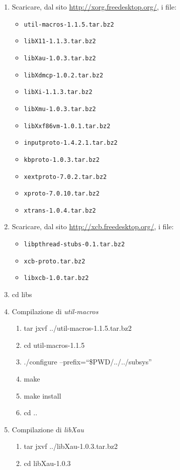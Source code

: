 \begin{enumerate}
\item Scaricare, dal sito \href{http://xorg.freedesktop.org/}{http://xorg.freedesktop.org/}, i file:
\begin{itemize}
\item \texttt{util-macros-1.1.5.tar.bz2}
\item \texttt{libX11-1.1.3.tar.bz2}
\item \texttt{libXau-1.0.3.tar.bz2}
\item \texttt{libXdmcp-1.0.2.tar.bz2}
\item \texttt{libXi-1.1.3.tar.bz2}
\item \texttt{libXmu-1.0.3.tar.bz2}
\item \texttt{libXxf86vm-1.0.1.tar.bz2}
\item \texttt{inputproto-1.4.2.1.tar.bz2}
\item \texttt{kbproto-1.0.3.tar.bz2}
\item \texttt{xextproto-7.0.2.tar.bz2}
\item \texttt{xproto-7.0.10.tar.bz2}
\item \texttt{xtrans-1.0.4.tar.bz2}
\end{itemize}
\item Scaricare, dal sito \href{http://xcb.freedesktop.org/}{http://xcb.freedesktop.org/}, i file:
\begin{itemize}
\item \texttt{libpthread-stubs-0.1.tar.bz2}
\item \texttt{xcb-proto.tar.bz2}
\item \texttt{libxcb-1.0.tar.bz2}
\end{itemize}
\item cd libs
\item Compilazione di \emph{util-macros}
\begin{enumerate}
\item tar jxvf ../util-macros-1.1.5.tar.bz2
\item cd util-macros-1.1.5
\item ./configure --prefix=``\$PWD/../../subsys''
\item make
\item make install
\item cd ..
\end{enumerate}
\item Compilazione di \emph{libXau}
\begin{enumerate}
\item tar jxvf ../libXau-1.0.3.tar.bz2
\item cd libXau-1.0.3

\end{enumerate}
\end{enumerate}
